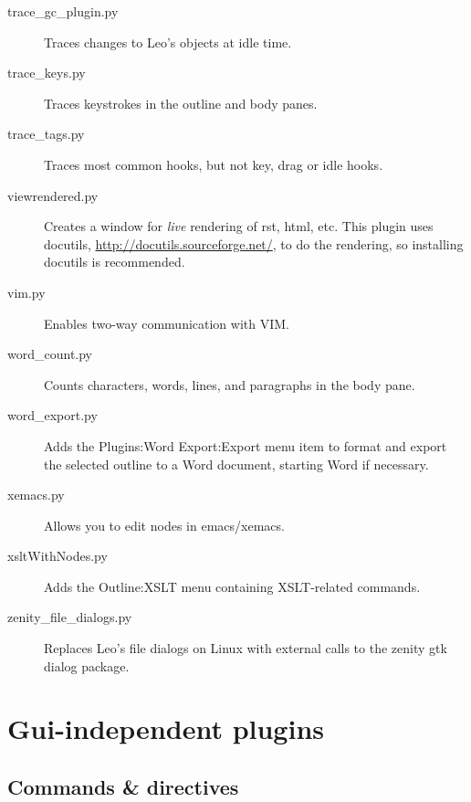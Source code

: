 \documentclass[a4paper,10pt,english]{sphinxmanual}
\begin{document}
\begin{description}
\item[{trace\_gc\_plugin.py}] \leavevmode
Traces changes to Leo's objects at idle time.

\item[{trace\_keys.py}] \leavevmode
Traces keystrokes in the outline and body panes.

\item[{trace\_tags.py}] \leavevmode
Traces most common hooks, but not key, drag or idle hooks.

\item[{viewrendered.py}] \leavevmode
Creates a window for \emph{live} rendering of rst, html, etc.
This plugin uses docutils, \href{http://docutils.sourceforge.net/}{http://docutils.sourceforge.net/},
to do the rendering, so installing docutils is recommended.

\item[{vim.py}] \leavevmode
Enables two-way communication with VIM.

\item[{word\_count.py}] \leavevmode
Counts characters, words, lines, and paragraphs in the body pane.

\item[{word\_export.py}] \leavevmode
Adds the Plugins:Word Export:Export menu item to format and export
the selected outline to a Word document, starting Word if necessary.

\item[{xemacs.py}] \leavevmode
Allows you to edit nodes in emacs/xemacs.

\item[{xsltWithNodes.py}] \leavevmode
Adds the Outline:XSLT menu containing XSLT-related commands.

\item[{zenity\_file\_dialogs.py}] \leavevmode
Replaces Leo's file dialogs on Linux with external
calls to the zenity gtk dialog package.

\end{description}


\section{Gui-independent plugins}
\label{plugins:gui-independent-plugins}

\subsection{Commands \& directives}
\label{plugins:commands-directives}
\end{document}
